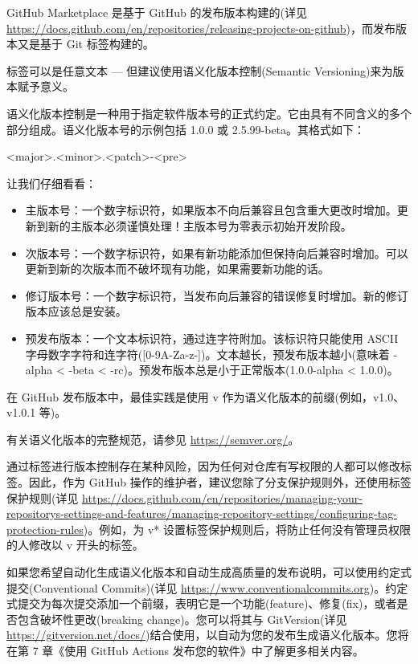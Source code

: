 GitHub Marketplace 是基于 GitHub 的发布版本构建的(详见 \url{https://docs.github.com/en/repositories/releasing-projects-on-github})，而发布版本又是基于 Git 标签构建的。

标签可以是任意文本 --- 但建议使用语义化版本控制(Semantic Versioning)来为版本赋予意义。

语义化版本控制是一种用于指定软件版本号的正式约定。它由具有不同含义的多个部分组成。语义化版本号的示例包括 1.0.0 或 2.5.99-beta。其格式如下：

\begin{shell}
<major>.<minor>.<patch>-<pre>
\end{shell}

让我们仔细看看：

\begin{itemize}
\item 
主版本号：一个数字标识符，如果版本不向后兼容且包含重大更改时增加。更新到新的主版本必须谨慎处理！主版本号为零表示初始开发阶段。

\item 
次版本号：一个数字标识符，如果有新功能添加但保持向后兼容时增加。可以更新到新的次版本而不破坏现有功能，如果需要新功能的话。

\item 
修订版本号：一个数字标识符，当发布向后兼容的错误修复时增加。新的修订版本应该总是安装。

\item 
预发布版本：一个文本标识符，通过连字符附加。该标识符只能使用 ASCII 字母数字字符和连字符([0-9A-Za-z-])。文本越长，预发布版本越小(意味着 -alpha < -beta < -rc)。预发布版本总是小于正常版本(1.0.0-alpha < 1.0.0)。
\end{itemize}


在 GitHub 发布版本中，最佳实践是使用 v 作为语义化版本的前缀(例如，v1.0、v1.0.1 等)。

有关语义化版本的完整规范，请参见 \url{https://semver.org/}。


通过标签进行版本控制存在某种风险，因为任何对仓库有写权限的人都可以修改标签。因此，作为 GitHub 操作的维护者，建议您除了分支保护规则外，还使用标签保护规则(详见 \url{https://docs.github.com/en/repositories/managing-your-repositorys-settings-and-features/managing-repository-settings/configuring-tag-protection-rules})。例如，为 v* 设置标签保护规则后，将防止任何没有管理员权限的人修改以 v 开头的标签。

如果您希望自动化生成语义化版本和自动生成高质量的发布说明，可以使用约定式提交(Conventional Commits)(详见 \url{https://www.conventionalcommits.org})。约定式提交为每次提交添加一个前缀，表明它是一个功能(feature)、修复(fix)，或者是否包含破坏性更改(breaking change)。您可以将其与 GitVersion(详见 \url{https://gitversion.net/docs/})结合使用，以自动为您的发布生成语义化版本。您将在第 7 章《使用 GitHub Actions 发布您的软件》中了解更多相关内容。